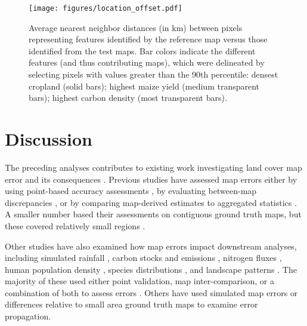 \documentclass[a4paper]{article}
\begin{document}

\begin{figure}[!ht]
\centerline{\texttt{[image: figures/location\_offset.pdf]}}
\caption{Average nearest neighbor distances (in km) between pixels representing features identified by the reference map versus those identified from the test maps. Bar colors indicate the different features (and thus contributing maps), which were delineated by selecting pixels with values greater than the 90th percentile: densest cropland (solid bars); highest maize yield (medium transparent bars); highest carbon density (most transparent bars).}   
\label{afoto}
\end{figure}


\vspace{-0.5 cm}
\section*{Discussion}
\vspace{-0.2 cm}

The preceding analyses contributes to existing work investigating land cover map error and its consequences \citep[e.g.][]{fritz_highlighting_2011,verburg_challenges_2011,olofsson_making_2013}. Previous studies have assessed map errors either by using point-based accuracy assessments \citep[e.g.][]{olofsson_making_2013,frey_how_2007-1,foody_status_2002}, by evaluating between-map discrepancies \citep[e.g.][]{fritz_highlighting_2011,fritz_identifying_2008,fritz_comparison_2010}, or by comparing map-derived estimates to aggregated statistics \citep[e.g.][]{larsen_taken_2015,fritz_comparison_2010,yu_meta-discoveries_2014}. A smaller number based their assessments on contiguous ground truth maps, but these covered relatively small regions \cite[$<$3000 km$^2$, or $<$0.03\% of the area covered here;][]{dendoncker_exploring_2008,schmit_limitations_2006}.

Other studies have also examined how map errors impact downstream analyses, including simulated rainfall \citep{ge_impacts_2007}, carbon stocks and emissions \citep{goetz_mapping_2009, quaife_impact_2008, olofsson_making_2013,jain_co2_2013}, nitrogen fluxes \citep{jain_co2_2013,nol_effect_2008}, human population density \citep{linard_assessing_2010}, species distributions \citep{tuanmu_global_2014}, and landscape patterns \citep{langford_map_2006}. The majority of these used either point validation, map inter-comparison, or a combination of both to assess errors \citep{goetz_mapping_2009, olofsson_making_2013, jain_co2_2013, linard_assessing_2010, quaife_impact_2008,tuanmu_global_2014}. Others have used simulated map errors \citep{ge_impacts_2007,langford_map_2006} or differences relative to small area ground truth maps \citep[$<$1000 m;][]{nol_effect_2008} to examine error propagation.
\end{document}
